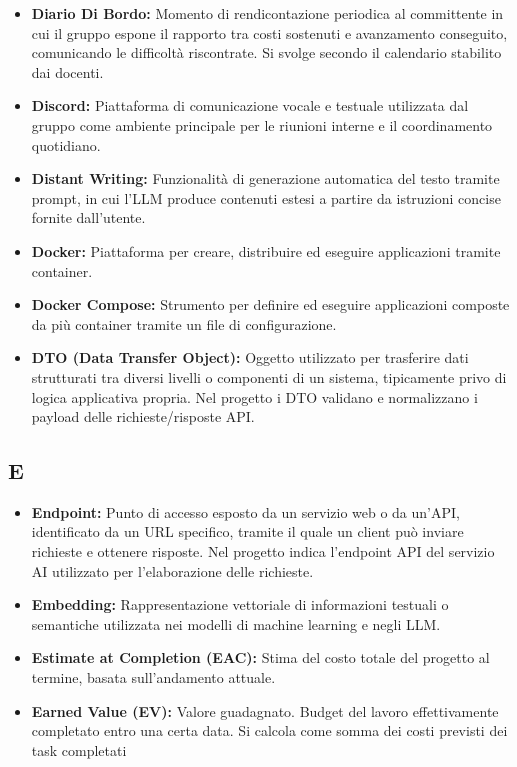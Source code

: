 \begin{itemize}[leftmargin=*]
      \item \textbf{Diario Di Bordo:} Momento di rendicontazione periodica al committente
      in cui il gruppo espone il rapporto tra costi sostenuti e avanzamento
      conseguito, comunicando le difficoltà riscontrate. Si svolge secondo il
      calendario stabilito dai docenti.
      \item \textbf{Discord:} Piattaforma di comunicazione vocale e testuale utilizzata
            dal gruppo come ambiente principale per le riunioni interne e il coordinamento
            quotidiano.
      \item \textbf{Distant Writing:} Funzionalità di generazione automatica del testo tramite prompt, in cui l’LLM produce contenuti estesi a partire da istruzioni concise fornite dall’utente.
      \item \textbf{Docker:} Piattaforma per creare, distribuire ed eseguire applicazioni
      tramite container.
      \item \textbf{Docker Compose:} Strumento per definire ed eseguire applicazioni
      composte da più container tramite un file di configurazione.
      \item \textbf{DTO (Data Transfer Object):} Oggetto utilizzato per trasferire dati strutturati tra diversi livelli o componenti di un sistema, tipicamente privo di logica applicativa propria. Nel progetto i DTO validano e normalizzano i payload delle richieste/risposte API.
\end{itemize}
 
{}
\subsection*{E}
\begin{itemize}[leftmargin=*]
      \item \textbf{Endpoint:} Punto di accesso esposto da un servizio web o da un'API, identificato da un URL specifico, tramite il quale un client può inviare richieste e ottenere risposte. Nel progetto indica l'endpoint API del servizio AI utilizzato per l'elaborazione delle richieste.
      \item \textbf{Embedding:} Rappresentazione vettoriale di informazioni testuali o semantiche utilizzata nei modelli di machine learning e negli LLM.
      \item \textbf{Estimate at Completion (EAC):} Stima del costo totale del 
      progetto al termine, basata sull'andamento attuale.
      \item \textbf{Earned Value (EV):} Valore guadagnato. 
      Budget del lavoro effettivamente completato entro una certa data. 
      Si calcola come somma dei costi previsti dei task completati
\end{itemize}
 
